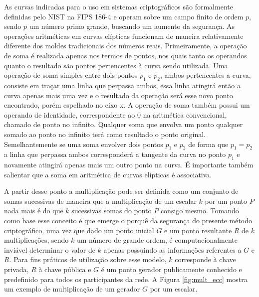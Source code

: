 %
As curvas indicadas para o uso em sistemas criptográficos são formalmente definidas pelo NIST na FIPS 186-4 e operam sobre um campo finito de ordem $p$, sendo $p$ um número primo grande, buscando um aumento da segurança. As operações aritméticas em curvas elípticas funcionam de maneira relativamente diferente dos moldes tradicionais dos números reais. Primeiramente, a operação de soma é realizada apenas nos termos de pontos, nos quais tanto os operandos quanto o resultado são pontos pertencentes à curva sendo utilizada. Uma operação de soma simples entre dois pontos $p_1$ e $p_2$, ambos pertencentes a curva, consiste em traçar uma linha que perpassa ambos, essa linha atingirá então a curva apenas mais uma vez e o resultado da operação será esse novo ponto encontrado, porém espelhado no eixo x. A operação de soma também possui um operando de identidade, correspondente ao 0 na aritmética convencional, chamado de ponto no infinito. Qualquer soma que envolva um ponto qualquer somado ao ponto no infinito terá como resultado o ponto original. Semelhantemente se uma soma envolver dois pontos $p_1$ e $p_2$ de forma que $p_1 = p_2$ a linha que perpassa ambos corresponderá a tangente da curva no ponto $p_1$ e novamente atingirá apenas mais um outro ponto na curva. É importante também salientar que a soma em aritmética de curvas elípticas é associativa.

%
A partir desse ponto a multiplicação pode ser definida como um conjunto de somas sucessivas de maneira que a multiplicação de um escalar $k$ por um ponto $P$ nada mais é do que $k$ sucessivas somas do ponto $P$ consigo mesmo. Tomando como base esse conceito é que emerge o porquê da segurança do presente método criptográfico, uma vez que dado um ponto inicial $G$ e um ponto resultante $R$ de $k$ multiplicações, sendo $k$ um número de grande ordem, é computacionalmente inviável determinar o valor de $k$ apenas possuindo as informações referentes a $G$ e $R$. Para fins práticos de utilização sobre esse modelo, $k$ corresponde à chave privada, $R$ à chave pública e $G$ é um ponto gerador publicamente conhecido e predefinido para todos os participantes da rede. A Figura \ref{fig:mult_ecc} mostra um exemplo de multiplicação de um gerador $G$ por um escalar. 

